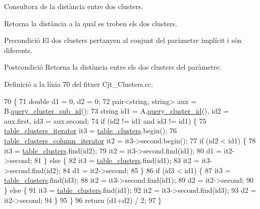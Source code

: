 Consultora de la distància entre dos clusters. 

Retorna la distància a la qual es troben els dos clusters.

\begin{DoxyPrecond}{Precondició}
El dos clusters pertanyen al conjunt del paràmetre implícit i són diferents. 
\end{DoxyPrecond}
\begin{DoxyPostcond}{Postcondició}
Retorna la distància entre els dos clusters del paràmetre. 
\end{DoxyPostcond}


Definició a la línia 70 del fitxer Cjt\+\_\+\+Clusters.\+cc.


\begin{DoxyCode}
70                                                           \{
71     \textcolor{keywordtype}{double} d1 = 0, d2 = 0;
72     pair<string, string> aux = B.\hyperlink{class_cluster_ae8c8a1d94203dccfd6fbbc5389a1e0ec}{query\_cluster\_sub\_id}();
73     \textcolor{keywordtype}{string} id1 = A.\hyperlink{class_cluster_a7e077596f7eb4f2bdf2847d65fa37654}{query\_cluster\_id}(), id2 = aux.first, id3 = aux.second;
74     \textcolor{keywordflow}{if} (id2 != id1 and id3 != id1) \{
75         \hyperlink{class_cjt___clusters_ac53ace59de6ecf75f90d7a4fc6e56c0e}{table\_clusters\_iterator} it3 = \hyperlink{class_cjt___clusters_a6af3fcf70683cdb88f137f6f51002939}{table\_clusters}.begin();
76         \hyperlink{class_cjt___clusters_abdef6142bd4683a878bb393a9095555e}{table\_clusters\_column\_iterator} it2 = it3->second.begin();
77         \textcolor{keywordflow}{if} (id2 < id1) \{
78             it3 = \hyperlink{class_cjt___clusters_a6af3fcf70683cdb88f137f6f51002939}{table\_clusters}.find(id2);
79             it2 = it3->second.find(id1);
80             d1 = it2->second;
81         \} \textcolor{keywordflow}{else} \{
82             it3 = \hyperlink{class_cjt___clusters_a6af3fcf70683cdb88f137f6f51002939}{table\_clusters}.find(id1);
83             it2 = it3->second.find(id2);
84             d1 = it2->second;
85         \}
86         \textcolor{keywordflow}{if} (id3 < id1) \{
87             it3 = \hyperlink{class_cjt___clusters_a6af3fcf70683cdb88f137f6f51002939}{table\_clusters}.find(id3);
88             it2 = it3->second.find(id1);
89             d2 = it2->second;            
90         \} \textcolor{keywordflow}{else} \{
91             it3 = \hyperlink{class_cjt___clusters_a6af3fcf70683cdb88f137f6f51002939}{table\_clusters}.find(id1);
92             it2 = it3->second.find(id3);
93             d2 = it2->second;                
94         \}   
95     \}   
96     \textcolor{keywordflow}{return} (d1+d2) / 2;    
97 \}
\end{DoxyCode}
\mbox{\label{class_cjt___clusters_ad794d3d1b0df7adb7fbb35d21634f5a0}} 
